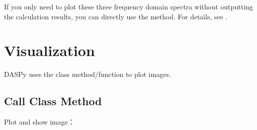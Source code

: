 \documentclass[letterpaper,10pt,english]{sphinxmanual}
\let\sphinxpxdimen\pdfpxdimen\else\newdimen\sphinxpxdimen
\begin{document}
\begin{sphinxVerbatim}[commandchars=\\\{\}]
   
     
    
\end{sphinxVerbatim}

\sphinxAtStartPar
If you only need to plot these three frequency domain spectra without outputting the calculation results, you can directly use the  method. For details, see {\hyperref[\detokenize{Visualization::doc}]{}} .

\sphinxstepscope


\section{Visualization}
\label{\detokenize{Visualization:visualization}}\label{\detokenize{Visualization::doc}}
\sphinxAtStartPar
DASPy uses the  class method/function  to plot images.


\subsection{Call Class Method}
\label{\detokenize{Visualization:call-class-method}}
\sphinxAtStartPar
Plot and show image：

\begin{sphinxVerbatim}[commandchars=\\\{\}]
   
  
\end{sphinxVerbatim}

\noindent\sphinxincludegraphics[width=600\sphinxpxdimen]{{waveform}.png}
\end{document}
